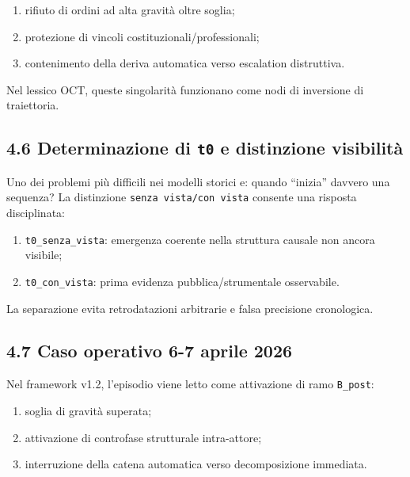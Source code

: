 \begin{enumerate}
\def\labelenumi{\arabic{enumi}.}
\tightlist
\item
  rifiuto di ordini ad alta gravità oltre soglia;
\item
  protezione di vincoli costituzionali/professionali;
\item
  contenimento della deriva automatica verso escalation distruttiva.
\end{enumerate}

Nel lessico OCT, queste singolarità funzionano come nodi di inversione di traiettoria.

\subsection{\texorpdfstring{4.6 Determinazione di \texttt{t0} e distinzione visibilità}{4.6 Determinazione di t0 e distinzione visibilità}}

Uno dei problemi più difficili nei modelli storici e: quando ``inizia'' davvero una sequenza? La distinzione \texttt{senza\ vista/con\ vista} consente una risposta disciplinata:

\begin{enumerate}
\def\labelenumi{\arabic{enumi}.}
\tightlist
\item
  \texttt{t0\_senza\_vista}: emergenza coerente nella struttura causale non ancora visibile;
\item
  \texttt{t0\_con\_vista}: prima evidenza pubblica/strumentale osservabile.
\end{enumerate}

La separazione evita retrodatazioni arbitrarie e falsa precisione cronologica.

\subsection{4.7 Caso operativo 6-7 aprile 2026}

Nel framework v1.2, l'episodio viene letto come attivazione di ramo \texttt{B\_post}:

\begin{enumerate}
\def\labelenumi{\arabic{enumi}.}
\tightlist
\item
  soglia di gravità superata;
\item
  attivazione di controfase strutturale intra-attore;
\item
  interruzione della catena automatica verso decomposizione immediata.
\end{enumerate}

